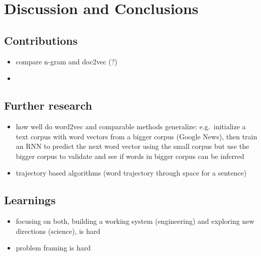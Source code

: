 
\clearpage
\section{Discussion and Conclusions}

\subsection{Contributions}
\label{sub:contributions}

\begin{itemize}
  \item compare n-gram and doc2vec (?)
  \item
\end{itemize}

\subsection{Further research}
\label{sub:further-research}

\begin{itemize}
  \item how well do word2vec and comparable methods generalize: e.g.\ initialize a text corpus with word vectors from a bigger corpus (Google News), then train an RNN to predict the next word vector using the small corpus but use the bigger corpus to validate and see if words in bigger corpus can be inferred
  \item trajectory based algorithms (word trajectory through space for a sentence)
\end{itemize}


\subsection{Learnings}
\label{sub:learnings}

\begin{itemize}
  \item focusing on both, building a working system (engineering) and exploring new directions (science), is hard
  \item problem framing is hard
\end{itemize}
